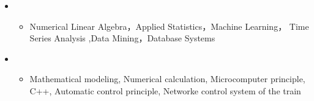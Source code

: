   \begin{itemize}[leftmargin=*]

      
  
      \item
      {\small
      \begin{itemize}
        \item{Numerical Linear Algebra，Applied Statistics，Machine Learning， Time Series Analysis ,Data Mining，Database Systems}
      \end{itemize}
      }
      
        \item
      {\small
      \begin{itemize}
        \item{Mathematical modeling, Numerical calculation, Microcomputer principle, C++, Automatic control principle, Networke control system of the train}
      \end{itemize}
      }
      
  \end{itemize} 